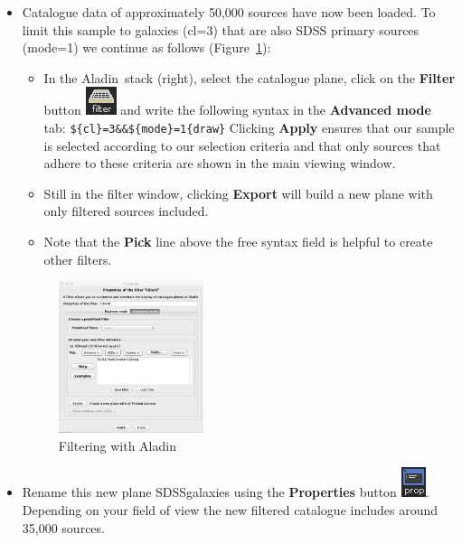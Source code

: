 \documentclass [a4paper, 12pt]{article}
\newcommand{\aladin}{{\textsc{A}{ladin}}}
\begin{document}
\begin{itemize}
\item Catalogue data of approximately 50,000 sources have now been loaded. To 
limit this sample to galaxies (cl=3) that are also SDSS primary sources 
(mode=1) we continue as follows (Figure~\ref{fig:aladinfilter}):
\begin{itemize}
    \item In the \aladin\ stack (right), select the catalogue plane, click on 
    the \textbf{Filter} button  \includegraphics[width=0.04  
    \textwidth]{../images/aladin_button_filter.png} and write the following 
    syntax in the \textbf{Advanced mode} tab: \newline
    \texttt{\$\{cl\}=3\&\&\$\{mode\}=1\{draw\}} \newline
    Clicking \textbf{Apply} ensures that our sample is selected according to 
    our selection criteria and that only sources that adhere to these criteria 
    are shown in the main viewing window. 
    \item Still in the filter window, clicking \textbf{Export} will build a new 
    plane with only filtered sources included.
    \item Note that the \textbf{Pick} line above the free syntax field is 
    helpful to create other filters.
\end{itemize}

\begin{figure}[H]
\center
\includegraphics[width=0.4\textwidth]{../images/aladin_filter_galaxies-sdss.jpg}
\caption{Filtering with \aladin}
\label{fig:aladinfilter}
\end{figure}

\item Rename this new plane SDSSgalaxies using the \textbf{Properties} button  
\includegraphics[width=0.03
\textwidth]{../images/aladin_button_properties.png}. Depending on your field of 
view the new filtered catalogue includes around 35,000 sources.


\end{itemize}
\end{document}
